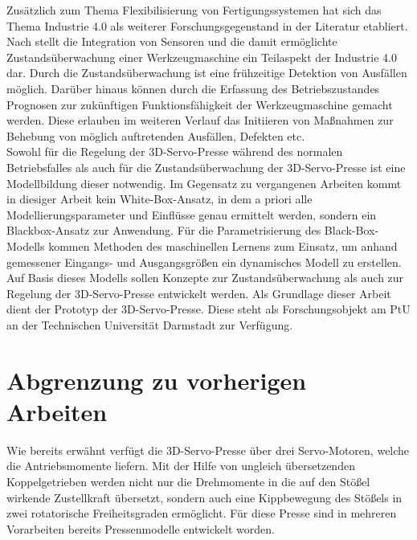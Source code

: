 Zusätzlich zum Thema Flexibilisierung von Fertigungssystemen hat sich das Thema Industrie 4.0 als weiterer Forschungsgegenstand in der Literatur etabliert. Nach \cite{VDMA.2018} stellt die Integration von Sensoren und die damit ermöglichte Zustandsüberwachung einer Werkzeugmaschine ein Teilaspekt der Industrie 4.0 dar. Durch die Zustandsüberwachung ist eine frühzeitige Detektion von Ausfällen möglich. Darüber hinaus können durch die Erfassung des Betriebszustandes Prognosen zur zukünftigen Funktionsfähigkeit der Werkzeugmaschine gemacht werden. Diese erlauben im weiteren Verlauf das Initiieren von Maßnahmen zur Behebung von möglich auftretenden Ausfällen, Defekten etc. \cite{VDMA.2018} \\

Sowohl für die Regelung der 3D-Servo-Presse während des normalen Betriebsfalles als auch für die Zustandsüberwachung der 3D-Servo-Presse ist eine Modellbildung dieser notwendig. Im Gegensatz zu vergangenen Arbeiten kommt in diesiger Arbeit kein White-Box-Ansatz, in dem a priori alle Modellierungsparameter und Einflüsse genau ermittelt werden, sondern ein Blackbox-Ansatz zur Anwendung. Für die Parametrisierung des Black-Box-Modells kommen Methoden des maschinellen Lernens zum Einsatz, um anhand gemessener Eingangs- und Ausgangsgrößen ein dynamisches Modell zu erstellen. Auf Basis dieses Modells sollen Konzepte zur Zustandsüberwachung als auch zur Regelung der 3D-Servo-Presse entwickelt werden. Als Grundlage dieser Arbeit dient der Prototyp der 3D-Servo-Presse. Diese steht als Forschungsobjekt am PtU an der Technischen Universität Darmstadt zur Verfügung. \\

\section{Abgrenzung zu vorherigen Arbeiten}
\label{cha:Abgrenzung}
Wie bereits erwähnt verfügt die 3D-Servo-Presse über drei Servo-Motoren, welche die Antriebsmomente liefern. Mit der Hilfe von ungleich übersetzenden Koppelgetrieben werden nicht nur die Drehmomente in die auf den Stößel wirkende Zustellkraft übersetzt, sondern auch eine Kippbewegung des Stößels in zwei rotatorische Freiheitsgraden ermöglicht. Für diese Presse sind in mehreren Vorarbeiten bereits Pressenmodelle entwickelt worden. \\


